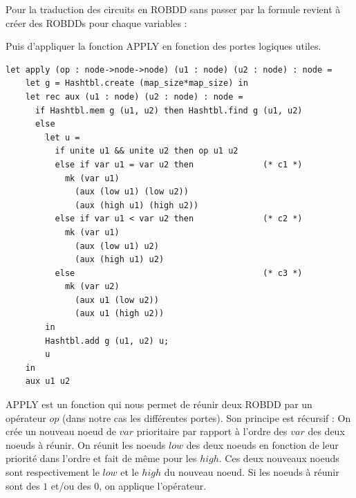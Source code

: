 \documentclass[a4paper, oneside]{report}
\begin{document}
Pour la traduction des circuits en ROBDD sans passer par la formule revient à créer des ROBDDs pour chaque variables :

\begin{figure}[h]
   \begin{minipage}[c]{\largeur}
   \end{minipage} \hfill
\end{figure}

Puis d'appliquer la fonction APPLY en fonction des portes logiques utiles.\\

\newpage

\begin{lstlisting}
let apply (op : node->node->node) (u1 : node) (u2 : node) : node =
    let g = Hashtbl.create (map_size*map_size) in
    let rec aux (u1 : node) (u2 : node) : node =
      if Hashtbl.mem g (u1, u2) then Hashtbl.find g (u1, u2)
      else
        let u =
          if unite u1 && unite u2 then op u1 u2
          else if var u1 = var u2 then              (* c1 *) 
            mk (var u1)
              (aux (low u1) (low u2)) 
              (aux (high u1) (high u2))
          else if var u1 < var u2 then              (* c2 *) 
            mk (var u1)
              (aux (low u1) u2) 
              (aux (high u1) u2)
          else                                      (* c3 *)
            mk (var u2)
              (aux u1 (low u2)) 
              (aux u1 (high u2))
        in 
        Hashtbl.add g (u1, u2) u;
        u
    in
    aux u1 u2
\end{lstlisting}

APPLY est un fonction qui nous permet de réunir deux ROBDD par un opérateur $op$ (dans notre cas les différentes portes). Son principe est récursif : On crée un nouveau noeud de $var$ prioritaire par rapport à l'ordre des $var$ des deux noeuds à réunir. On réunit les noeuds $low$ des deux noeuds en fonction de leur priorité dans l'ordre et fait de même pour les $high$. Ces deux nouveaux noeuds sont respectivement le $low$ et le $high$ du nouveau noeud. Si les noeuds à réunir sont des $1$ et/ou des $0$, on applique l'opérateur.\\
\end{document}

